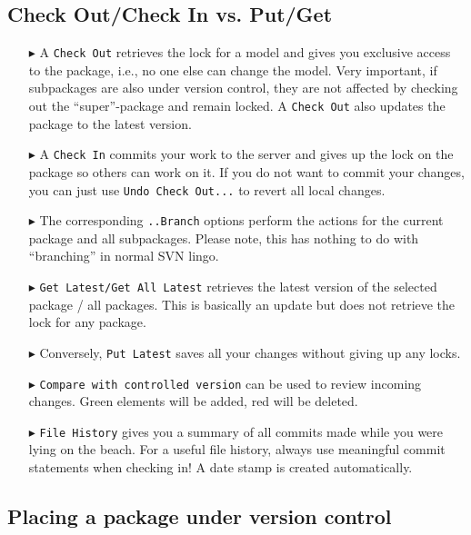 \subsection{Check Out/Check In vs. Put/Get}

\begin{enumerate}
  \item[$\blacktriangleright$] A \texttt{Check Out} retrieves the lock for a model and gives you exclusive access to the package, i.e., no one else can change the model. 
  Very important, if subpackages are also under version control, they are not affected by checking out the ``super''-package and remain locked.
  A \texttt{Check Out} also updates the package to the latest version.

\item[$\blacktriangleright$] A \texttt{Check In} commits your work to the server and gives up the lock on the package so others can work on it.
If you do not want to commit your changes, you can just use \texttt{Undo Check Out...} to revert all local changes.

\item[$\blacktriangleright$]  The corresponding \texttt{..Branch} options perform the actions for the current package and all subpackages.
Please note, this has nothing to do with ``branching'' in normal SVN lingo.

\item[$\blacktriangleright$] \texttt{Get Latest/Get All Latest} retrieves the latest version of the selected package / all packages. 
This is basically an update but does not retrieve the lock for any package.

\item[$\blacktriangleright$] Conversely, \texttt{Put Latest} saves all your changes without giving up any locks.

\item[$\blacktriangleright$] \texttt{Compare with controlled version} can be used to review incoming changes. 
Green elements will be added, red will be deleted. 

\item[$\blacktriangleright$] \texttt{File History} gives you a summary of all commits made while you were lying on the beach. 
For a useful file history, always use meaningful commit statements when checking in! 
A date stamp is created automatically.
\end{enumerate}


\subsection{Placing a package under version control}

